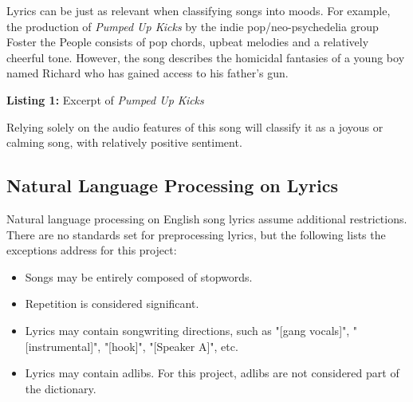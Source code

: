 \documentclass[11pt]{article}
\begin{document}
Lyrics can be just as relevant when classifying songs into moods. For example, the production of \textit{Pumped Up Kicks} by the indie pop/neo-psychedelia group Foster the People consists of pop chords, upbeat melodies and a relatively cheerful tone. However, the song describes the homicidal fantasies of a young boy named Richard who has gained access to his father's gun.

\setlength{\fboxrule}{0pt}
\begin{BOX}[ht]
  \centering
  \caption*{\textbf{Listing 1:} Excerpt of \textit{Pumped Up Kicks}}
\end{BOX}

Relying solely on the audio features of this song will classify it as a joyous or calming song, with relatively positive sentiment.

\subsection{Natural Language Processing on Lyrics}

Natural language processing on English song lyrics assume additional restrictions. There are no standards set for preprocessing lyrics, but the following lists the exceptions address for this project:
\begin{itemize}
  \item Songs may be entirely composed of stopwords.
  \item Repetition is considered significant.
  \item Lyrics may contain songwriting directions, such as "[gang vocals]", "[instrumental]", "[hook]", "[Speaker A]", etc.
  \item Lyrics may contain adlibs. For this project, adlibs are not considered part of the dictionary.
\end{itemize}
\end{document}
